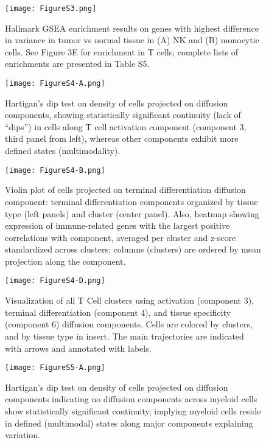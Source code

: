 \begin{figure}
\centering
\texttt{[image: FigureS3.png]}
\caption{Hallmark GSEA enrichment results on genes with highest difference in variance in tumor vs normal tissue in (A) NK and (B) monocytic cells. See Figure 3E for enrichment in T cells; complete lists of enrichments are presented in Table S5.
}
\label{fig:s3}
\end{figure}


\begin{figure}
\centering
\texttt{[image: FigureS4-A.png]}
\caption{Hartigan’s dip test on density of cells projected on diffusion components, showing statistically significant continuity (lack of “dips”) in cells along T cell activation component (component 3, third panel from left), whereas other components exhibit more defined states (multimodality).
}
\label{fig:s4a}
\end{figure}

\begin{figure}
\centering
\texttt{[image: FigureS4-B.png]}
\caption{Violin plot of cells projected on terminal differentiation diffusion component: terminal differentiation components organized by tissue type (left panels) and cluster (center panel). Also, heatmap showing expression of immune-related genes with the largest positive correlations with component, averaged per cluster and z-score standardized across clusters; columns (clusters) are ordered by mean projection along the component.
}
\label{fig:s4b}
\end{figure}

\begin{figure}
\centering
\texttt{[image: FigureS4-D.png]}
\caption{Visualization of all T Cell clusters using activation (component 3), terminal differentiation (component 4), and tissue specificity (component 6) diffusion components. Cells are colored by clusters, and by tissue type in insert. The main trajectories are indicated with arrows and annotated with labels.
}
\label{fig:s4d}
\end{figure}


\begin{figure}
\centering
\texttt{[image: FigureS5-A.png]}
\caption{Hartigan’s dip test on density of cells projected on diffusion components indicating no diffusion components across myeloid cells show statistically significant continuity, implying myeloid cells reside in defined (multimodal) states along major components explaining variation.
}
\label{fig:s5a}
\end{figure}

